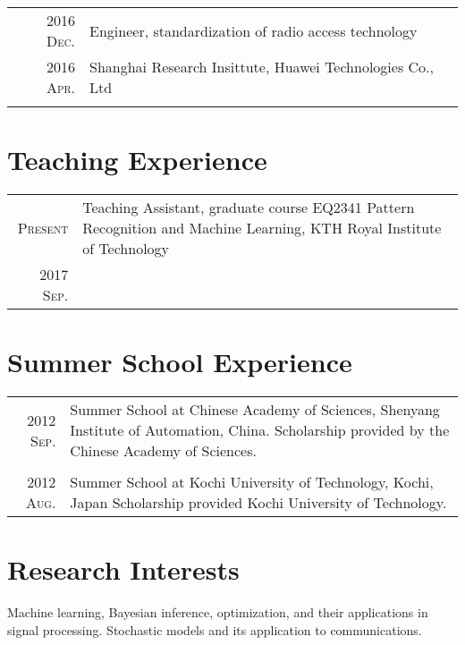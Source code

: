 \documentclass[a4paper,10pt]{article}
\begin{document}
\begin{tabular}{r|p{13cm}}

  \textsc{2016 Dec.}  & Engineer, standardization of radio access technology  \\
  \textsc{2016 Apr.}  & Shanghai Research Insittute, Huawei Technologies Co., Ltd \\
  \multicolumn{2}{c}{} \\

\end{tabular}

\section{Teaching Experience}
\begin{tabular}{r|p{13cm}}

  \textsc{Present}  & Teaching Assistant, graduate course EQ2341 Pattern Recognition and Machine Learning, KTH Royal Institute of Technology \\
  \textsc{2017 Sep.}  & {}  \\

\end{tabular}
\section{Summer School Experience}
\begin{tabular}{r|p{13cm}}

  \textsc{2012 Sep.}  & Summer School at Chinese Academy of Sciences, Shenyang Institute of Automation, China. Scholarship provided by the Chinese Academy of Sciences. \\
  \multicolumn{2}{c}{}\\
  \textsc{2012 Aug.}  & Summer School at Kochi University of Technology, Kochi, Japan Scholarship provided Kochi University of Technology.  \\

\end{tabular}

\section{Research Interests}
Machine learning, Bayesian inference, optimization, and their applications in signal
processing. Stochastic models and its application to communications.
\begin{bibunit}
  \renewcommand\refname{Publications}
  \nocite{liu2019neural,
    liu2019discontinuous,
    liu2019entropy,
    liu2019alpha,
    liu2019dominant,
    liu2018will,
    liu2015bounds,
    wang2015rsh,
    zhang2015effective,
    liu2015node,
    wang2015structural,
    liu2014secondary,
    liuenergy,
    ren2015applying,
    ren2015spectram,
    ren2015spectrum}
  \footnotesize{\putbib[../bibfile]}

\end{bibunit}
\end{document}
